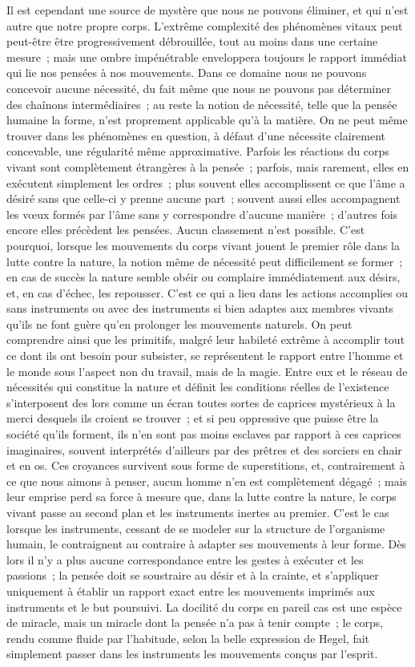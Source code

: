 \documentclass[french,twoside]{book} %
\begin{document}
Il est cependant une source de mystère que nous ne pouvons éliminer, et qui n'est autre que notre propre corps. L'extrême complexité des phénomènes vitaux peut peut-être être progressivement débrouillée, tout au moins dans une certaine mesure ; mais une ombre impénétrable enveloppera toujours le rapport immédiat qui lie nos pensées à nos mouvements. Dans ce domaine nous ne pouvons concevoir aucune nécessité, du fait même que nous ne pouvons pas déterminer des chaînons intermédiaires ; au reste la notion de nécessité, telle que la pensée humaine la forme, n'est proprement applicable qu'à la matière. On ne peut même trouver dans les phénomènes en question, à défaut d'une nécessite clairement concevable, une régularité même approximative. Parfois les réactions du corps vivant sont complètement étrangères à la pensée ; parfois, mais rarement, elles en exécutent simplement les ordres ; plus souvent elles accomplissent ce que l'âme a désiré sans que celle-ci y prenne aucune part ; souvent aussi elles accompagnent les vœux formés par l'âme sans y correspondre d'aucune manière ; d'autres fois encore elles précèdent les pensées. Aucun classement n'est possible. C'est pourquoi, lorsque les mouvements du corps vivant jouent le premier rôle dans la lutte contre la nature, la notion même de nécessité peut difficilement se former ; en cas de succès la nature semble obéir ou complaire immédiatement aux désirs, et, en cas d'échec, les repousser. C'est ce qui a lieu dans les actions accomplies ou sans instruments ou avec des instruments si bien adaptes aux membres vivants qu'ils ne font guère qu'en prolonger les mouvements naturels. On peut comprendre ainsi que les primitifs, malgré leur habileté extrême à accomplir tout ce dont ils ont besoin pour subsister, se représentent le rapport entre l'homme et le monde sous l'aspect non du travail, mais de la magie. Entre eux et le réseau de nécessités qui constitue la nature et définit les conditions réelles de l'existence s'interposent des lors comme un écran toutes sortes de caprices mystérieux à la merci desquels ils croient se trouver ; et si peu oppressive que puisse être la société qu'ils forment, ils n'en sont pas moins esclaves par rapport à ces caprices imaginaires, souvent interprétés d'ailleurs par des prêtres et des sorciers en chair et en os. Ces croyances survivent sous forme de superstitions, et, contrairement à ce que nous aimons à penser, aucun homme n'en est complètement dégagé ; mais leur emprise perd sa force à mesure que, dans la lutte contre la nature, le corps vivant passe au second plan et les instruments inertes au premier. C'est le cas lorsque les instruments, cessant de se modeler sur la structure de l'organisme humain, le contraignent au contraire à adapter ses mouvements à leur forme. Dès lors il n'y a plus aucune correspondance entre les gestes à exécuter et les passions ; la pensée doit se soustraire au désir et à la crainte, et s'appliquer uniquement à établir un rapport exact entre les mouvements imprimés aux instruments et le but poursuivi. La docilité du corps en pareil cas est une espèce de miracle, mais un miracle dont la pensée n'a pas à tenir compte ; le corps, rendu comme fluide par l'habitude, selon la belle expression de Hegel, fait simplement passer dans les instruments les mouvements conçus par l'esprit. 
\end{document}
